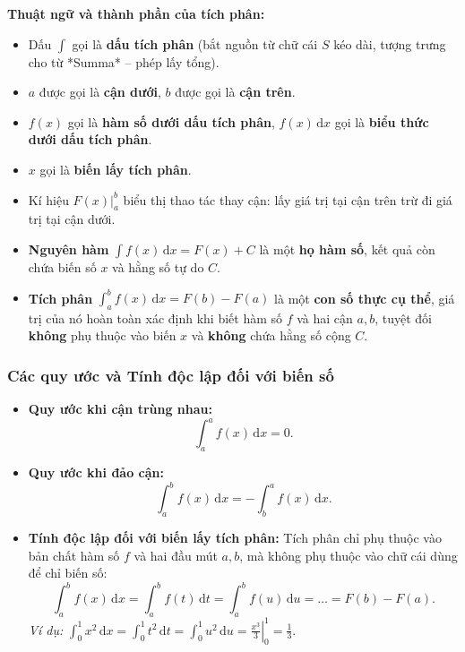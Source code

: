 \documentclass[12pt]{article}
\begin{document}
	\noindent \textbf{Thuật ngữ và thành phần của tích phân:}
	\begin{itemize}
		\item Dấu $\displaystyle \int$ gọi là \textbf{dấu tích phân} (bắt nguồn từ chữ cái $S$ kéo dài, tượng trưng cho từ *Summa* -- phép lấy tổng).
		\item $a$ được gọi là \textbf{cận dưới}, $b$ được gọi là \textbf{cận trên}.
		\item $f(x)$ gọi là \textbf{hàm số dưới dấu tích phân}, $f(x)\,\mathrm{d}x$ gọi là \textbf{biểu thức dưới dấu tích phân}.
		\item $x$ gọi là \textbf{biến lấy tích phân}.
		\item Kí hiệu $\displaystyle \left. F(x) \right|_a^b$ biểu thị thao tác thay cận: lấy giá trị tại cận trên trừ đi giá trị tại cận dưới.
	\end{itemize}
	
	\begin{tcolorbox}[colback=orange!6!white, colframe=orange!75!black, title=\textbf{Phân biệt cốt lõi: Nguyên hàm và Tích phân}]
		\begin{itemize}
			\item \textbf{Nguyên hàm} $\displaystyle \int f(x)\,\mathrm{d}x = F(x) + C$ là một \textbf{họ hàm số}, kết quả còn chứa biến số $x$ và hằng số tự do $C$.
			\item \textbf{Tích phân} $\displaystyle \int_a^b f(x)\,\mathrm{d}x = F(b) - F(a)$ là một \textbf{con số thực cụ thể}, giá trị của nó hoàn toàn xác định khi biết hàm số $f$ và hai cận $a, b$, tuyệt đối \textbf{không} phụ thuộc vào biến $x$ và \textbf{không} chứa hằng số cộng $C$.
		\end{itemize}
	\end{tcolorbox}
	
	\subsubsection{Các quy ước và Tính độc lập đối với biến số}
	
	\begin{itemize}
		\item \textbf{Quy ước khi cận trùng nhau:}
		\[
		\int_a^a f(x)\,\mathrm{d}x = 0.
		\]
		\item \textbf{Quy ước khi đảo cận:}
		\[
		\int_a^b f(x)\,\mathrm{d}x = -\int_b^a f(x)\,\mathrm{d}x.
		\]
		\item \textbf{Tính độc lập đối với biến lấy tích phân:} Tích phân chỉ phụ thuộc vào bản chất hàm số $f$ và hai đầu mút $a, b$, mà không phụ thuộc vào chữ cái dùng để chỉ biến số:
		\[
		\int_a^b f(x)\,\mathrm{d}x = \int_a^b f(t)\,\mathrm{d}t = \int_a^b f(u)\,\mathrm{d}u = \dots = F(b) - F(a).
		\]
		\textit{Ví dụ:} $\displaystyle \int_0^1 x^2\,\mathrm{d}x = \int_0^1 t^2\,\mathrm{d}t = \int_0^1 u^2\,\mathrm{d}u = \left. \frac{x^3}{3} \right|_0^1 = \frac{1}{3}$.
	\end{itemize}
\end{document}
